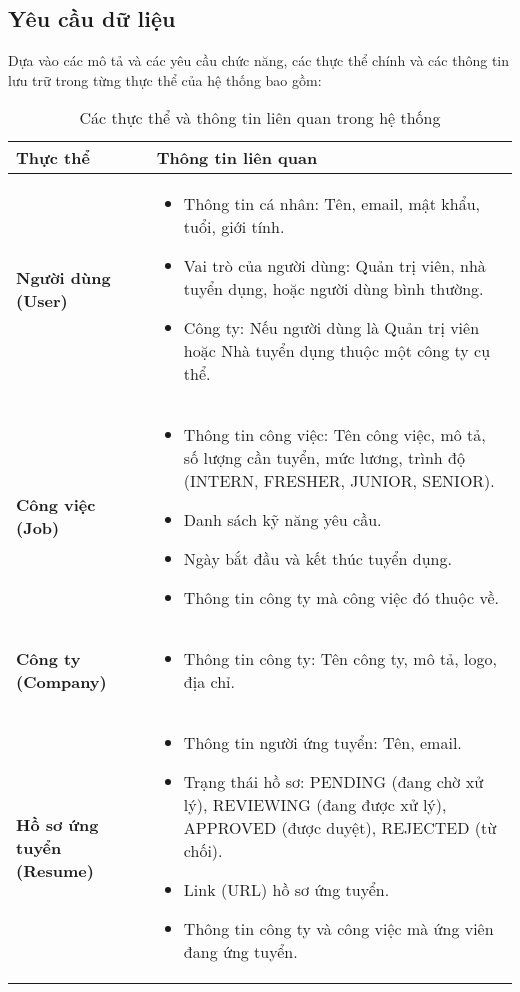 \subsection{Yêu cầu dữ liệu}

Dựa vào các mô tả và các yêu cầu chức năng, các thực thể chính và các thông tin lưu trữ trong từng thực thể của hệ thống bao gồm:
\begin{table}[H]
\centering
\caption{Các thực thể và thông tin liên quan trong hệ thống}
\renewcommand{\arraystretch}{1.5} 
\begin{tabular}{|>{\centering\arraybackslash}m{4cm}|>{\centering\arraybackslash}m{11cm}|}
\hline
\textbf{Thực thể} & \textbf{Thông tin liên quan} \\ \hline

\textbf{Người dùng (User)} 
& 
\begin{itemize}
    \item Thông tin cá nhân: Tên, email, mật khẩu, tuổi, giới tính.
    \item Vai trò của người dùng: Quản trị viên, nhà tuyển dụng, hoặc người dùng bình thường.
    \item Công ty: Nếu người dùng là Quản trị viên hoặc Nhà tuyển dụng thuộc một công ty cụ thể.
\end{itemize} \\ \hline

\textbf{Công việc (Job)} 
& 
\begin{itemize}
    \item Thông tin công việc: Tên công việc, mô tả, số lượng cần tuyển, mức lương, trình độ (INTERN, FRESHER, JUNIOR, SENIOR).
    \item Danh sách kỹ năng yêu cầu.
    \item Ngày bắt đầu và kết thúc tuyển dụng.
    \item Thông tin công ty mà công việc đó thuộc về.
\end{itemize} \\ \hline

\textbf{Công ty (Company)} 
& 
\begin{itemize}
    \item Thông tin công ty: Tên công ty, mô tả, logo, địa chỉ.
\end{itemize} \\ \hline

\textbf{Hồ sơ ứng tuyển (Resume)} 
& 
\begin{itemize}
    \item Thông tin người ứng tuyển: Tên, email.
    \item Trạng thái hồ sơ: PENDING (đang chờ xử lý), REVIEWING (đang được xử lý), APPROVED (được duyệt), REJECTED (từ chối).
    \item Link (URL) hồ sơ ứng tuyển.
    \item Thông tin công ty và công việc mà ứng viên đang ứng tuyển.
\end{itemize} \\ \hline

\end{tabular}
\label{tab:entities}
\end{table}


